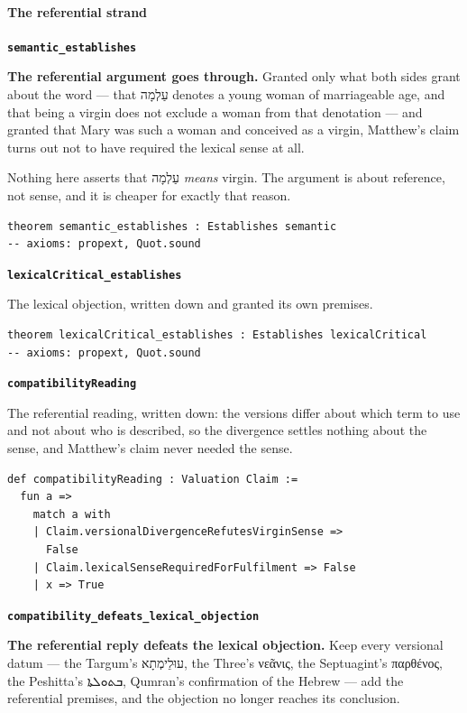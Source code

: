 \documentclass[11pt]{article}
\begin{document}
\paragraph*{The referential strand}
\leavevmode\par
\par\medskip\noindent\textbf{\texttt{semantic\_\allowbreak{}establishes}}\par\nobreak\noindent
\textbf{The referential argument goes through.} Granted only what both sides grant about the word — that עַלְמָה denotes a young woman of marriageable age, and that being a virgin does not exclude a woman from that denotation — and granted that Mary was such a woman and conceived as a virgin, Matthew's claim turns out not to have required the lexical sense at all.

Nothing here asserts that עַלְמָה \emph{means} virgin. The argument is about reference, not sense, and it is cheaper for exactly that reason.

{\small\begin{verbatim}
theorem semantic_establishes : Establishes semantic
-- axioms: propext, Quot.sound
\end{verbatim}}
\par\medskip\noindent\textbf{\texttt{lexical\allowbreak{}Critical\_\allowbreak{}establishes}}\par\nobreak\noindent
The lexical objection, written down and granted its own premises.

{\small\begin{verbatim}
theorem lexicalCritical_establishes : Establishes lexicalCritical
-- axioms: propext, Quot.sound
\end{verbatim}}
\par\medskip\noindent\textbf{\texttt{compatibility\allowbreak{}Reading}}\par\nobreak\noindent
The referential reading, written down: the versions differ about which term to use and not about who is described, so the divergence settles nothing about the sense, and Matthew's claim never needed the sense.

{\small\begin{verbatim}
def compatibilityReading : Valuation Claim :=
  fun a =>
    match a with
    | Claim.versionalDivergenceRefutesVirginSense =>
      False
    | Claim.lexicalSenseRequiredForFulfilment => False
    | x => True
\end{verbatim}}
\par\medskip\noindent\textbf{\texttt{compatibility\_\allowbreak{}defeats\_\allowbreak{}lexical\_\allowbreak{}objection}}\par\nobreak\noindent
\textbf{The referential reply defeats the lexical objection.} Keep every versional datum — the Targum's עוּלֵימְתָא, the Three's νεᾶνις, the Septuagint's παρθένος, the Peshitta's ܒܬܘܠܬܐ, Qumran's confirmation of the Hebrew — add the referential premises, and the objection no longer reaches its conclusion.
\end{document}
